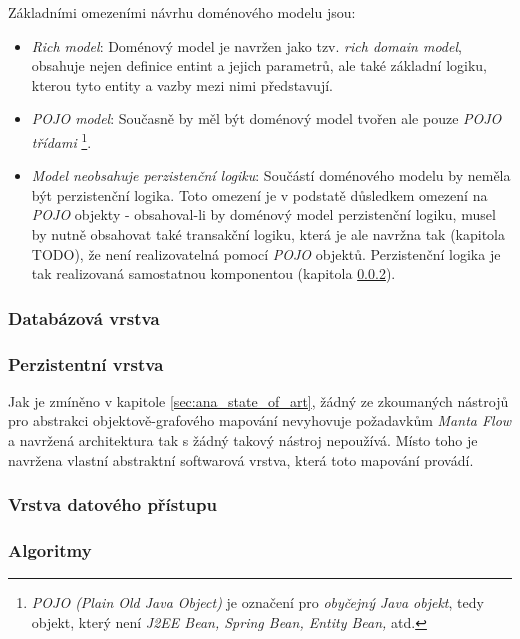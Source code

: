 Základními omezeními návrhu doménového modelu jsou:
\begin{itemize}
   \item{\textit{Rich model}}: Doménový model je navržen jako tzv. \textit{rich domain model}, obsahuje nejen definice entint a jejich parametrů, ale také základní logiku, kterou tyto entity a vazby mezi nimi představují.
   \item{\textit{POJO model}}: Současně by měl být doménový model tvořen ale pouze \textit{POJO třídami} \footnote{\textit{POJO (Plain Old Java Object)} je označení pro \textit{obyčejný Java objekt}, tedy objekt, který není \textit{J2EE Bean, Spring Bean, Entity Bean,}  atd.}.
   \item{\textit{Model neobsahuje perzistenční logiku}}: Součástí doménového modelu by neměla být perzistenční logika. Toto omezení je v podstatě důsledkem omezení na \textit{POJO} objekty - obsahoval-li by doménový model perzistenční logiku, musel by nutně obsahovat také transakční logiku, která je ale navržna tak (kapitola TODO), že není realizovatelná pomocí \textit{POJO} objektů. Perzistenční logika je tak realizovaná samostatnou komponentou (kapitola \ref{sec:des_persistence}).
\end{itemize}

\subsubsection{Databázová vrstva}
\label{sec:des_database}

\subsubsection{Perzistentní vrstva}
\label{sec:des_persistence}
Jak je zmíněno v kapitole \ref{sec:ana_state_of_art}, žádný ze zkoumaných nástrojů pro abstrakci objektově-grafového mapování nevyhovuje požadavkům \textit{Manta Flow} a navržená architektura tak s žádný takový nástroj nepoužívá. Místo toho je navržena vlastní abstraktní softwarová vrstva, která toto mapování provádí.

\subsubsection{Vrstva datového přístupu}
\label{sec:des_data_access}

\subsubsection{Algoritmy}

